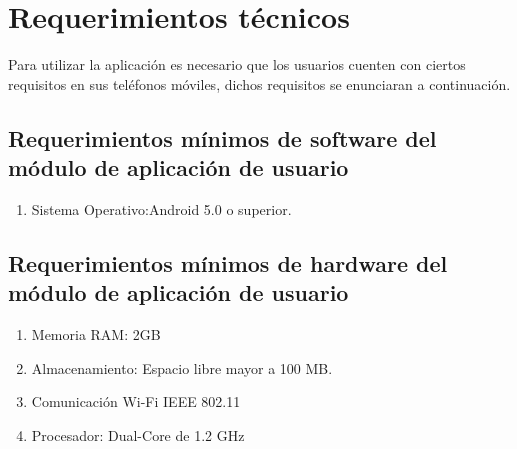 \section{Requerimientos técnicos}
Para utilizar la aplicación es necesario que los usuarios cuenten con ciertos requisitos en sus teléfonos móviles, dichos requisitos se enunciaran a continuación.
\subsection{Requerimientos mínimos de software del módulo de aplicación de usuario}
\begin{enumerate}
	\item Sistema Operativo:Android 5.0 o superior.
\end{enumerate}
\subsection{Requerimientos mínimos de hardware del módulo de aplicación de usuario}
\begin{enumerate}
	\item Memoria RAM: 2GB
	\item Almacenamiento: Espacio libre mayor a 100 MB.
	\item Comunicación Wi-Fi IEEE 802.11 
	\item Procesador: Dual-Core de 1.2 GHz
\end{enumerate}